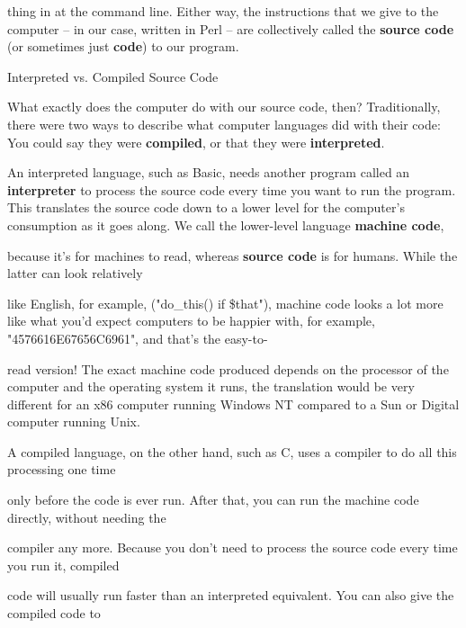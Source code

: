 \documentclass[a4paper,11pt]{book}
\begin{document}
\noindent thing in at the command line. Either way, the instructions that we give to the computer -- in our case, written in Perl -- are collectively called the \textbf{source code }(or sometimes just \textbf{code}) to our program.

\noindent 

\noindent Interpreted vs. Compiled Source Code

\noindent 

\noindent What exactly does the computer do with our source code, then? Traditionally, there were two ways to describe what computer languages did with their code: You could say they were \textbf{compiled}, or that they were \textbf{interpreted}.

\noindent 

\noindent An interpreted language, such as Basic, needs another program called an \textbf{interpreter }to process the source code every time you want to run the program. This translates the source code down to a lower level for the computer's consumption as it goes along. We call the lower-level language \textbf{machine code},

\noindent because it's for machines to read, whereas \textbf{source code }is for humans. While the latter can look relatively

\noindent like English, for example,  ("do\_this() if \$that"), machine code looks a lot more like what you'd expect computers to be happier with, for example, "4576616E67656C6961", and that's the easy-to-

\noindent read version! The exact machine code produced depends on the processor of the computer and the operating system it runs, the translation would be very different for an x86 computer running Windows NT compared to a Sun or Digital computer running Unix.

\noindent 

\noindent A compiled language, on the other hand, such as C, uses a compiler to do all this processing one time

\noindent only before the code is ever run. After that, you can run the machine code directly, without needing the

\noindent 

\noindent 

\noindent compiler any more. Because you don't need to process the source code every time you run it, compiled

\noindent code will usually run faster than an interpreted equivalent. You can also give the compiled code to
\end{document}
